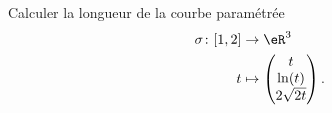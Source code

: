 
\begin{exercice}\label{exoOutilsMath-0061}

    Calculer la longueur de la courbe paramétrée
    \begin{equation}
        \begin{aligned}
            \sigma\colon \mathopen[ 1 , 2 \mathclose]&\to \eR^3 \\
            t&\mapsto \begin{pmatrix}
                t    \\ 
                \ln(t)    \\ 
                2\sqrt{2t}    
            \end{pmatrix}.
        \end{aligned}
    \end{equation}

\end{exercice}
